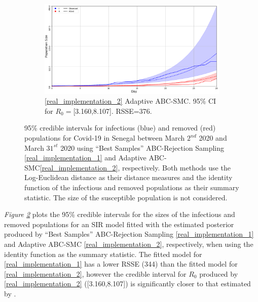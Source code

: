\documentclass[11pt,a4paper]{article}
\theoremstyle{break}
\begin{document}
\begin{figure}[H]
{\begin{subfigure}{.45\paperwidth}
        \includegraphics[width=\textwidth]{senegal_adapt_abc_smc_identity_ci.PNG}
        \caption{\ref{real_implementation_2} Adaptive ABC-SMC. 95\% CI for $R_0=$[3.160,8.107]. RSSE=376.}
        \label{fig_senegal_identity_ci_adapt_abc_smc}
      \end{subfigure}
    }
    \caption{95\% credible intervals for infectious (blue) and removed (red) populations for Covid-19 in Senegal between March $2^{nd}$ 2020 and March $31^{st}$ 2020 using ``Best Samples'' ABC-Rejection Sampling \ref{real_implementation_1} and Adaptive ABC-SMC\ref{real_implementation_2}, respectively. Both methods use the Log-Euclidean distance as their distance measures and the identity function of the infectious and removed populations as their summary statistic. The size of the susceptible population is not considered.}
    \label{fig_senegal_identity_ci}
  \end{figure}

  \par \textit{Figure \ref{fig_senegal_identity_ci}} plots the 95\% credible intervals for the sizes of the infectious and removed populations for an SIR model fitted with the estimated posterior produced by ``Best Samples'' ABC-Rejection Sampling \ref{real_implementation_1} and Adaptive ABC-SMC \ref{real_implementation_2}, respectively, when using the identity function as the summary statistic. The fitted model for \ref{real_implementation_1} has a lower RSSE (344) than the fitted model for \ref{real_implementation_2}, however the credible interval for $R_0$ produced by \ref{real_implementation_2} ([3.160,8.107]) is significantly closer to that estimated by \cite[]{estimated_r0_covid_19}.
\end{document}
